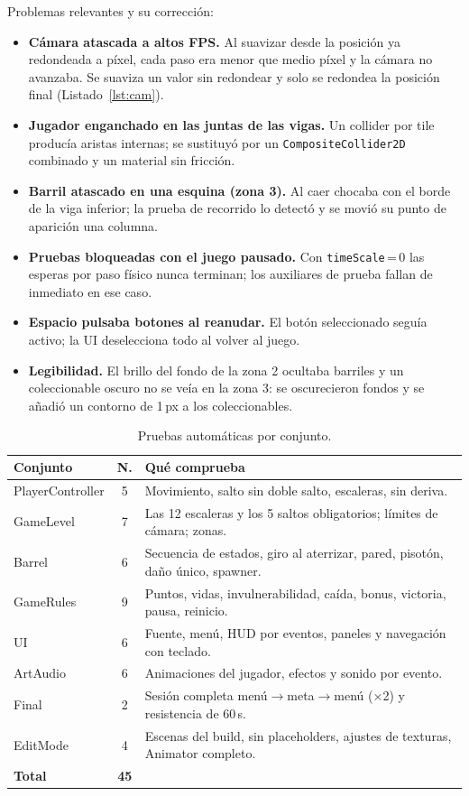 \documentclass[runningheads]{llncs}
\begin{document}
Problemas relevantes y su corrección:
\begin{itemize}
\item \textbf{Cámara atascada a altos FPS.} Al suavizar desde la posición ya redondeada a píxel, cada
paso era menor que medio píxel y la cámara no avanzaba. Se suaviza un valor sin redondear y solo se
redondea la posición final (Listado~\ref{lst:cam}).
\item \textbf{Jugador enganchado en las juntas de las vigas.} Un collider por tile producía aristas
internas; se sustituyó por un \texttt{CompositeCollider2D} combinado y un material sin fricción.
\item \textbf{Barril atascado en una esquina (zona 3).} Al caer chocaba con el borde de la viga
inferior; la prueba de recorrido lo detectó y se movió su punto de aparición una columna.
\item \textbf{Pruebas bloqueadas con el juego pausado.} Con \texttt{timeScale}\,=\,0 las esperas por
paso físico nunca terminan; los auxiliares de prueba fallan de inmediato en ese caso.
\item \textbf{Espacio pulsaba botones al reanudar.} El botón seleccionado seguía activo; la UI
deselecciona todo al volver al juego.
\item \textbf{Legibilidad.} El brillo del fondo de la zona 2 ocultaba barriles y un coleccionable oscuro
no se veía en la zona 3: se oscurecieron fondos y se añadió un contorno de 1\,px a los coleccionables.
\end{itemize}

\begin{table}[H]
\caption{Pruebas automáticas por conjunto.}\label{tab:tests}
\centering\scriptsize
\begin{tabularx}{\linewidth}{@{}lcX@{}}
\toprule
\textbf{Conjunto} & \textbf{N.} & \textbf{Qué comprueba} \\ \midrule
PlayerController & 5 & Movimiento, salto sin doble salto, escaleras, sin deriva. \\
GameLevel & 7 & Las 12 escaleras y los 5 saltos obligatorios; límites de cámara; zonas. \\
Barrel & 6 & Secuencia de estados, giro al aterrizar, pared, pisotón, daño único, spawner. \\
GameRules & 9 & Puntos, vidas, invulnerabilidad, caída, bonus, victoria, pausa, reinicio. \\
UI & 6 & Fuente, menú, HUD por eventos, paneles y navegación con teclado. \\
ArtAudio & 6 & Animaciones del jugador, efectos y sonido por evento. \\
Final & 2 & Sesión completa menú$\rightarrow$meta$\rightarrow$menú (×2) y resistencia de 60\,s. \\
EditMode & 4 & Escenas del build, sin placeholders, ajustes de texturas, Animator completo. \\
\midrule
\textbf{Total} & \textbf{45} & \\
\bottomrule
\end{tabularx}
\end{table}
\end{document}
